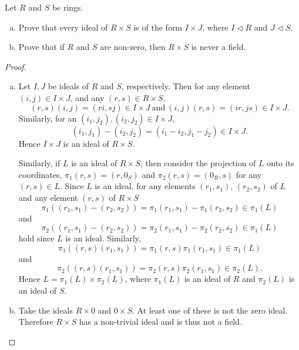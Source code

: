 \documentclass[10pt]{amsart}
\begin{document}
\begin{thm}
  Let $R$ and $S$ be rings.
  \begin{enumerate}[(a)]
  \item
    Prove that every ideal of $R \times S$ is of the form $I \times J$, where $I \lhd R$ and $J \lhd S$.
  \item
    Prove that if $R$ and $S$ are non-zero, then $R \times S$ is never a field.
  \end{enumerate}
  \begin{proof}
    \begin{enumerate}[(a)]
    \item
      Let $I, J$ be ideals of $R$ and $S$, respectively.
      Then for any element $(i,j) \in I \times J$, and any $(r,s) \in R \times S$,
      $$(r,s)(i,j) = (ri,sj) \in I \times J\ \text{and}\ (i,j)(r,s) = (ir,js) \in I \times J.$$
      Similarly, for an $(i_1,j_2), (i_2,j_2) \in I \times J$,
      $$(i_1,j_1) - (i_2,j_2) = (i_1 - i_2, j_1 - j_2) \in I \times J.$$
      Hence $I \times J$ is an ideal of $R \times S$.
      
      Similarly, if $L$ is an ideal of $R \times S$, then consider the projection of $L$ onto its coordinates, $\pi_1(r, s) = (r,0_S)$ and $\pi_2(r, s) = (0_R,s)$ for any $(r, s) \in L$.
      Since $L$ is an ideal, for any elements $(r_1, s_1)$, $(r_2,s_2)$ of $L$ and any element $(r,s)$ of $R \times S$
      $$\pi_1((r_1,s_1) - (r_2,s_2)) = \pi_1(r_1,s_1) - \pi_1(r_2,s_2) \in \pi_1(L)$$
      and
      $$\pi_2((r_1,s_1) - (r_2,s_2)) = \pi_2(r_1,s_1) - \pi_2(r_2,s_2) \in \pi_1(L)$$
      hold since $L$ is an ideal.
      Similarly, 
      $$\pi_1((r,s)(r_1,s_1)) = \pi_1(r,s)\pi_1(r_1,s_1) \in \pi_1(L)$$
      and
      $$\pi_2((r,s)(r_1,s_1)) = \pi_2(r,s)\pi_2(r_1,s_1) \in \pi_2(L).$$
      Hence $L = \pi_1(L) \times \pi_2(L)$, where $\pi_1(L)$ is an ideal of $R$ and $\pi_2(L)$ is an ideal of $S$.
    \item
      Take the ideals $R \times 0$ and $0 \times S$.
      At least one of these is not the zero ideal.
      Therefore $R \times S$ has a non-trivial ideal and is thus not a field.
    \end{enumerate}
  \end{proof}
\end{thm}
\end{document}
